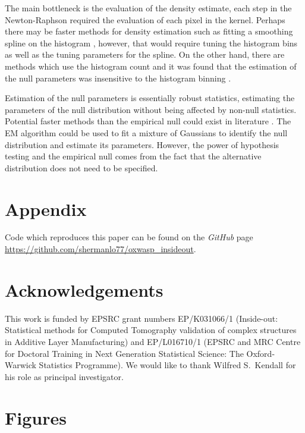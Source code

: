 \documentclass{article}
\renewcommand{\listoffigures}{\begingroup
\tocsection
\tocfile{\listfigurename}{lof}
\endgroup}
\begin{document}
The main bottleneck is the evaluation of the density estimate, each step in the Newton-Raphson required the evaluation of each pixel in the kernel. Perhaps there may be faster methods for density estimation such as fitting a smoothing spline on the histogram \citep{efron2004large}, however, that would require tuning the histogram bins as well as the tuning parameters for the spline. On the other hand, there are methods which use the histogram count and it was found that the estimation of the null parameters was insensitive to the histogram binning \citep{schwartzman2008empirical}.

Estimation of the null parameters is essentially robust statistics, estimating the parameters of the null distribution without being affected by non-null statistics. Potential faster methods than the empirical null could exist in literature \citep{hampel1986robust, huber2009robust, jewson2018principles, maronna2006robust, rousseeuw1987robust}. The EM algorithm \citep{bishop2006pattern, dempster1977maximum} could be used to fit a mixture of Gaussians to identify the null distribution and estimate its parameters. However, the power of hypothesis testing and the empirical null comes from the fact that the alternative distribution does not need to be specified.

\section{Appendix}
Code which reproduces this paper can be found on the \emph{GitHub} page \url{https://github.com/shermanlo77/oxwasp_insideout}.

\section{Acknowledgements}
This work is funded by EPSRC grant numbers EP/K031066/1 (Inside-out: Statistical methods for Computed Tomography validation of complex structures in Additive Layer Manufacturing) and EP/L016710/1 (EPSRC and MRC Centre for Doctoral Training in Next Generation Statistical Science: The Oxford-Warwick Statistics Programme). We would like to thank Wilfred S.~Kendall for his role as principal investigator.




\listoffigures
\clearpage
\section{Figures}
\end{document}
